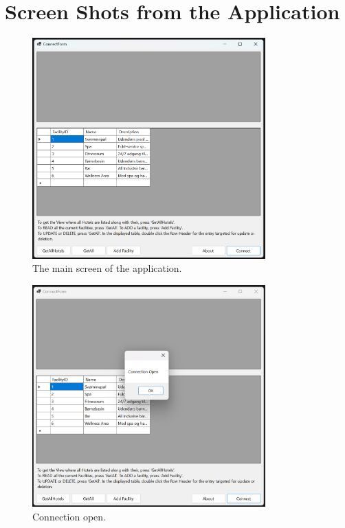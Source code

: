 \chapter{Screen Shots from the Application}
\label{app:screen-shots}

\begin{figure}
    \centering
    \includegraphics[width=0.8\textwidth]{figures/app-screenshots/1connectform.png}
    \caption{The main screen of the application.}
    \label{fig:1connectform}
\end{figure}

\begin{figure}
    \centering
    \includegraphics[width=0.8\textwidth]{figures/app-screenshots/2connectionopen.png}
    \caption{Connection open.}
    \label{fig:2connectionopen}
\end{figure}

